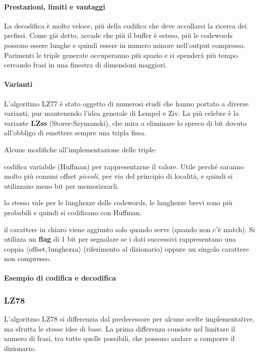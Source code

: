 \paragraph{Prestazioni, limiti e vantaggi}
La decodifica è molto veloce, più della codifica che deve accollarsi la ricerca dei prefissi. Come già detto, accade che più il buffer è esteso, più le codewords possono essere lunghe e quindi essere in numero minore nell'output compresso. Parimenti le triple generate occuperanno più spazio e si spenderà più tempo cercando frasi in una finestra di dimensioni maggiori.

\paragraph{Varianti}
L'algoritmo LZ77 è stato oggetto di numerosi studi che hanno portato a diverse varianti, pur mantenendo l'idea generale di Lempel e Ziv. La più celebre è la variante \textbf{LZss} (Storer-Szymanski), che mira a eliminare lo spreco di bit dovuto all'obbligo di emettere sempre una tripla fissa.

Alcune modifiche all'implementazione delle triple:
\begin{description}[font=\normalfont]
    \item[Indice:] codifica variabile (Huffman) per rappresentarne il valore. Utile perché saranno molto più comuni offset \textit{piccoli}, per via del principio di località, e quindi si utilizzano meno bit per memorizzarli.
    
    \item[Lunghezza:] lo stesso vale per le lunghezze delle codewords, le lunghezze brevi sono più probabili e quindi si codificano con Huffman.
    
    \item[Simbolo (LZss):] il carattere in chiaro viene aggiunto solo quando serve (quando non c'è match). Si utilizza un \textbf{flag} di 1 bit per segnalare se i dati successivi rappresentano una coppia $\langle \text{offset}, \text{lunghezza} \rangle$ (riferimento al dizionario) oppure un singolo carattere non compresso.
\end{description}


\paragraph{Esempio di codifica e decodifica}

\subsubsection{LZ78}
L'algoritmo LZ78 si differenzia dal predecessore per alcune scelte implementative, ma sfrutta le stesse idee di base.
La prima differenza consiste nel limitare il numero di frasi, tra tutte quelle possibili, che possono andare a comporre il dizionario.

